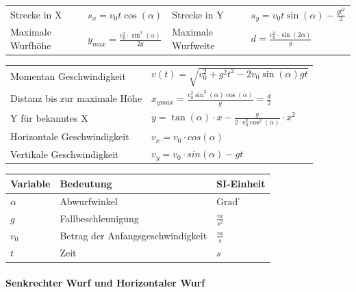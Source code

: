 \begin{tabbing}
	\begin{tabu} to \linewidth {X l X l}
		\toprule
		Strecke in X & $s_x = v_0 t \cos(\alpha)$ &
		Strecke in Y & $s_y = v_0 t \sin(\alpha)  - \frac{gt^2}{2}$ \\
		Maximale Wurfhöhe & $y_{max} = \frac{v_0^2 \cdot \sin^2(\alpha)}{2g}$ &
		Maximale Wurfweite & $d = \frac{v_0^2 \cdot \sin(2\alpha)}{g}$ \\
	\end{tabu}
\end{tabbing}

\begin{tabbing}
	\begin{tabu} to \linewidth {l X}
		Momentan Geschwindigkeit & $v(t) = \sqrt{v_0^2 + g^2 t^2 - 2 v_0 \sin(\alpha) gt}$ \\
		Distanz bis zur maximale Höhe & $x_{ymax} = \frac{v_0^2 \sin^2(\alpha) \cos(\alpha)}{g} = \frac{d}{2}$ \\
		Y für bekanntes X & $y = \tan(\alpha) \cdot x - \frac{g}{2 \cdot v_0^2 \cos^2(\alpha)} \cdot x^2 $ \\
		Horizontale Geschwindigkeit & $v_x = v_0 \cdot cos(\alpha)$ \\
		Vertikale Geschwindigkeit & $v_y = v_0 \cdot sin(\alpha) - g t$ \\
	\end{tabu}
\end{tabbing}

\begin{tabbing}
	\begin{tabu} to \linewidth {l X l}
		Variable & Bedeutung & SI-Einheit \\
		\midrule
		$\alpha$ & Abwurfwinkel & $\text{Grad}^\circ$ \\ 
		$g$ & Fallbeschleunigung  & $\frac{m}{s^2}$  \\ 
		$v_0$ & Betrag der Anfangsgeschwindigkeit & $\frac{m}{s}$ \\ 
		$t$ & Zeit & $s$ \\ 
		\bottomrule
	\end{tabu}
\end{tabbing}


\vfill\null
\columnbreak

\paragraph{Senkrechter Wurf und Horizontaler Wurf} \hfill \\

